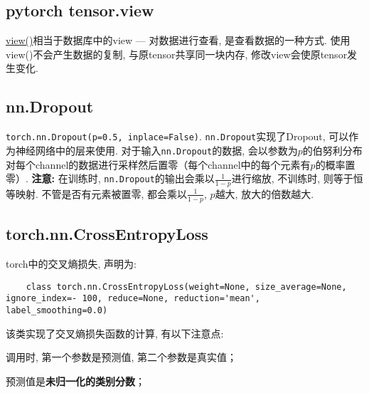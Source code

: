 \subsection{pytorch tensor.view}
\href{https://pytorch.org/docs/stable/tensor_view.html}{view()}相当于数据库中的view --- 对数据进行查看, 是查看数据的一种方式. 使用view()不会产生数据的复制, 与原tensor共享同一块内存, 修改view会使原tensor发生变化. 

\subsection{nn.Dropout}\label{nn_dropout}
\texttt{torch.nn.Dropout(p=0.5, inplace=False)}. \texttt{nn.Dropout}实现了Dropout, 可以作为神经网络中的层来使用. 对于输入\texttt{nn.Dropout}的数据, 会以参数为$p$的伯努利分布对每个channel的数据进行采样然后置零（每个channel中的每个元素有$p$的概率置零）. \textbf{注意: }在训练时, \texttt{nn.Dropout}的输出会乘以$\frac{1}{1 - p}$进行缩放, 不训练时, 则等于恒等映射. 不管是否有元素被置零, 都会乘以$\frac{1}{1 - p}$, $p$越大, 放大的倍数越大. 

\subsection{torch.nn.CrossEntropyLoss}
torch中的交叉熵损失, 声明为: 
\begin{verbatim}
	class torch.nn.CrossEntropyLoss(weight=None, size_average=None, ignore_index=- 100, reduce=None, reduction='mean', label_smoothing=0.0)
\end{verbatim}

该类实现了交叉熵损失函数的计算, 有以下注意点: 
\begin{myitemize}
	\item 调用时, 第一个参数是预测值, 第二个参数是真实值；
	\item 预测值是\textbf{未归一化的类别分数}；
\end{myitemize}
